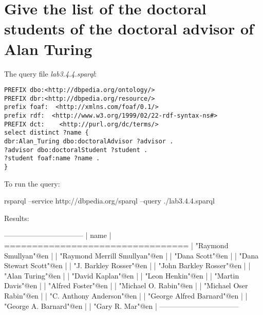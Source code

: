 \documentclass[a4paper, 12pt]{report}
\begin{document}
\section{Give the list of the doctoral students of the doctoral advisor of Alan Turing}       
The query file \emph{lab3.4.4.sparql}:
\begin{lstlisting}[frame=single]
PREFIX dbo:<http://dbpedia.org/ontology/>
PREFIX dbr:<http://dbpedia.org/resource/>
prefix foaf:  <http://xmlns.com/foaf/0.1/>
prefix rdf:  <http://www.w3.org/1999/02/22-rdf-syntax-ns#>
PREFIX dct:    <http://purl.org/dc/terms/>
select distinct ?name {
dbr:Alan_Turing dbo:doctoralAdvisor ?advisor .
?advisor dbo:doctoralStudent ?student .
?student foaf:name ?name .
}
\end{lstlisting}
To run the query:
\begin{commandshell}
    rsparql --service http://dbpedia.org/sparql --query ./lab3.4.4.sparql
\end{commandshell}
Results:
\begin{messageshell}
---------------------------------
| name                          |
=================================
| "Raymond Smullyan"@en         |
| "Raymond Merrill Smullyan"@en |
| "Dana Scott"@en               |
| "Dana Stewart Scott"@en       |
| "J. Barkley Rosser"@en        |
| "John Barkley Rosser"@en      |
| "Alan Turing"@en              |
| "David Kaplan"@en             |
| "Leon Henkin"@en              |
| "Martin Davis"@en             |
| "Alfred Foster"@en            |
| "Michael O. Rabin"@en         |
| "Michael Oser Rabin"@en       |
| "C. Anthony Anderson"@en      |
| "George Alfred Barnard"@en    |
| "George A. Barnard"@en        |
| "Gary R. Mar"@en              |
---------------------------------
\end{messageshell}
\end{document}
